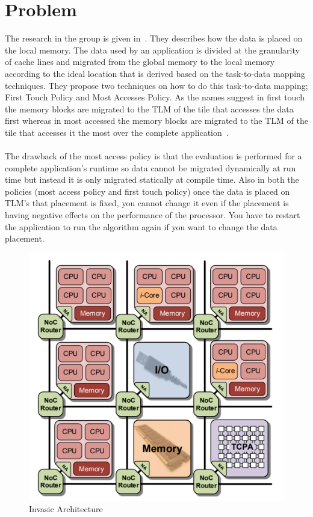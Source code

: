 \documentclass{listhesis}
\begin{document}
\section{Problem}
The research in the group is given in~\cite{lispaper}. They describes how the data is placed on the local memory. The data used by an application is divided at the granularity of cache lines and migrated from the global memory to the local memory according to the ideal location that is derived based on the task-to-data mapping techniques. They propose two techniques on how to do this task-to-data mapping; First Touch Policy and Most Accesses Policy. As the names suggest in first touch the memory blocks are migrated to the TLM of the tile that accesses the data first whereas in most accessed the memory blocks are migrated to the TLM of the tile that accesses it the most over the complete application~\cite{lispaper}. \\
\\
The drawback of the most access policy is that the evaluation is performed for a complete application's runtime so data cannot be migrated dynamically at run time but instead it is only migrated statically at compile time. Also in both the policies (most access policy and first touch policy) once the data is placed on TLM's that placement is fixed, you cannot change it even if the placement is having negative effects on the performance of the processor. You have to restart the application  to run the algorithm again if you want to change the data placement. 
\begin{figure}[h!]
  \includegraphics[width=0.7\linewidth]{multi-core,tile.png}
  \centering
  \caption{Invasic Architecture~\cite{iNetworkAdapter}}
  \label{fig:multi-core,tile}
\end{figure}
\end{document}
